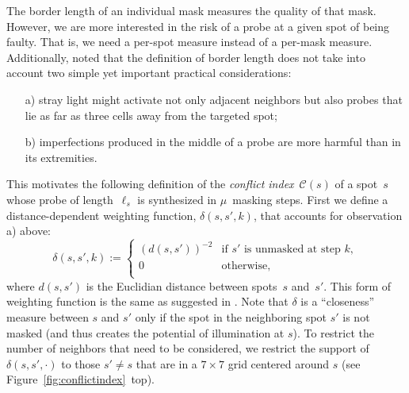\documentclass{bioinfo}
\begin{document}
The border length of an individual mask measures the quality of that
mask. However, we are more interested in the risk of a probe at a
given spot of being faulty. That is, we need a per-spot measure
instead of a per-mask measure. Additionally, \citet{KAHNG03A} noted
that the definition of border length does not take into account two
simple yet important practical considerations:
\begin{itemize}
\item[a)] stray light might activate not only adjacent neighbors but
  also probes that lie as far as three cells away from the targeted
  spot;
\item[b)] imperfections produced in the middle of a probe are more
  harmful than in its extremities.
\end{itemize}
This motivates the following definition of the \emph{conflict
  index}~$\mathcal{C}(s)$ of a spot~$s$ whose probe of
length~$\ell_{s}$ is synthesized in $\mu$~masking steps. First we
define a distance-dependent weighting function, $\delta(s,s',k)$, that
accounts for observation a) above:
\begin{equation}
\label{eq:dist_weight}
\delta(s,s',k) :=
        \left\{
                \begin{array}{ll}
                        (d(s,s'))^{-2} & \mbox{if $s'$ is unmasked at step $k$}, \\
                        0 & \mbox{otherwise}, \\
                \end{array}
        \right.
\end{equation}
where $d(s,s')$ is the Euclidian distance between spots~$s$ and~$s'$.
This form of weighting function is the same as suggested in
\citet{KAHNG03A}.  Note that $\delta$ is a ``closeness'' measure
between $s$ and $s'$ only if the spot in the neighboring spot $s'$ is
not masked (and thus creates the potential of illumination at $s$). To
restrict the number of neighbors that need to be considered, we
restrict the support of $\delta(s,s',\cdot)$ to those $s'\neq s$ that
are in a $7\times 7$ grid centered around $s$ (see
Figure~\ref{fig:conflictindex}~top).
\end{document}
